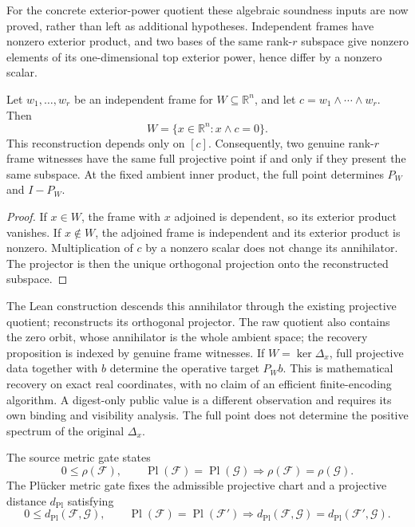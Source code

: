 For the concrete exterior-power quotient these algebraic soundness inputs are
now proved, rather than left as additional hypotheses. Independent frames have
nonzero exterior product, and two bases of the same rank-\(r\) subspace give
nonzero elements of its one-dimensional top exterior power, hence differ by
a nonzero scalar.

\begin{proposition}
\label{prop:plucker-recovery}
Let \(w_1,\ldots,w_r\) be an independent frame for \(W\subseteq\mathbb R^n\),
and let \(c=w_1\wedge\cdots\wedge w_r\). Then
\[
 W=\{x\in\mathbb R^n:x\wedge c=0\}.
\]
This reconstruction depends only on \([c]\). Consequently, two genuine
rank-\(r\) frame witnesses have the same full projective point if and only
if they present the same subspace. At the fixed ambient inner product, the
full point determines \(P_W\) and \(I-P_W\).
\end{proposition}
\begin{proof}
If \(x\in W\), the frame with \(x\) adjoined is dependent, so its exterior
product vanishes. If \(x\notin W\), the adjoined frame is independent and its
exterior product is nonzero. Multiplication of \(c\) by a nonzero scalar
does not change its annihilator. The projector is then the unique orthogonal
projection onto the reconstructed subspace.
\end{proof}

The Lean construction  descends this
annihilator through the existing projective quotient;
 reconstructs its orthogonal projector.
The raw quotient also contains the zero orbit, whose annihilator is the whole
ambient space; the recovery proposition is indexed by genuine frame witnesses.
If \(W=\ker\Delta_x\), full projective data together with \(b\) determine
the operative target \(P_Wb\). This is mathematical recovery on exact real
coordinates, with no claim of an efficient finite-encoding algorithm. A
digest-only public value is a different observation and requires its own
binding and visibility analysis. The full point does not determine the
positive spectrum of the original \(\Delta_x\).

The source metric gate states
\[
  0\le \rho(\mathcal F),\qquad
  \operatorname{Pl}(\mathcal F)=\operatorname{Pl}(\mathcal G)
  \Longrightarrow
  \rho(\mathcal F)=\rho(\mathcal G).
\]
The Pl\"ucker metric gate fixes the admissible projective chart and a projective
distance \(d_{\mathrm{Pl}}\) satisfying
\[
  0\le d_{\mathrm{Pl}}(\mathcal F,\mathcal G),
  \qquad
  \operatorname{Pl}(\mathcal F)=\operatorname{Pl}(\mathcal F')
  \Longrightarrow
  d_{\mathrm{Pl}}(\mathcal F,\mathcal G)
  =d_{\mathrm{Pl}}(\mathcal F',\mathcal G).
\]

